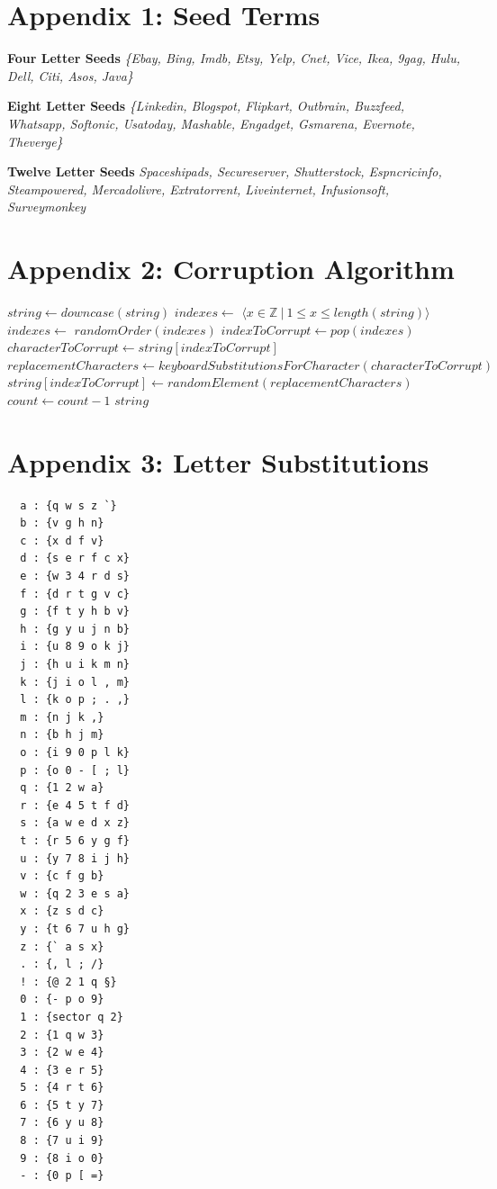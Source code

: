 \documentclass{csfourzero}
\begin{document}
\raggedbottom
\pagebreak


\pagebreak
\raggedbottom
\section{Appendix 1: Seed Terms}
\textbf{Four Letter Seeds}
\textit{\{Ebay, Bing, Imdb, Etsy, Yelp, Cnet, Vice, Ikea, 9gag, Hulu, Dell, Citi, Asos, Java\}}

\noindent
\textbf{Eight Letter Seeds}
\textit{\{Linkedin, Blogspot, Flipkart, Outbrain, Buzzfeed, Whatsapp, Softonic, Usatoday, Mashable, Engadget, Gsmarena, Evernote, Theverge\}}

\noindent
\textbf{Twelve Letter Seeds}
\textit{{Spaceshipads, Secureserver, Shutterstock, Espncricinfo, Steampowered, Mercadolivre, Extratorrent, Liveinternet, Infusionsoft, Surveymonkey}}

\pagebreak
\raggedbottom
\section{Appendix 2: Corruption Algorithm}
  \begin{algorithmic}
        \State $string \gets downcase(string)$
        \State $indexes \gets$ $\langle x \in \mathbb{Z} \ \vert \ 1 \leq x \leq length(string) \rangle$
        \State $indexes \gets$ $randomOrder(indexes)$
        \Repeat
        \State $indexToCorrupt \gets pop(indexes)$
        \State $characterToCorrupt \gets string[indexToCorrupt]$
        \State $replacementCharacters \gets keyboardSubstitutionsForCharacter(characterToCorrupt)$
        \State $string[indexToCorrupt] \gets randomElement(replacementCharacters)$
        \State $count \gets count - 1$
        \State \Return $string$
    \EndFunction
  \end{algorithmic}

\pagebreak
\raggedbottom
\section{Appendix 3: Letter Substitutions}
\begin{multicols}{2}
  \begin{verbatim}
  a : {q w s z `}
  b : {v g h n}
  c : {x d f v}
  d : {s e r f c x}
  e : {w 3 4 r d s}
  f : {d r t g v c}
  g : {f t y h b v}
  h : {g y u j n b}
  i : {u 8 9 o k j}
  j : {h u i k m n}
  k : {j i o l , m}
  l : {k o p ; . ,}
  m : {n j k ,}
  n : {b h j m}
  o : {i 9 0 p l k}
  p : {o 0 - [ ; l}
  q : {1 2 w a}
  r : {e 4 5 t f d}
  s : {a w e d x z}
  t : {r 5 6 y g f}
  u : {y 7 8 i j h}
  v : {c f g b}
  w : {q 2 3 e s a}
  x : {z s d c}
  y : {t 6 7 u h g}
  z : {` a s x}
  . : {, l ; /}
  ! : {@ 2 1 q §}
  0 : {- p o 9}
  1 : {sector q 2}
  2 : {1 q w 3}
  3 : {2 w e 4}
  4 : {3 e r 5}
  5 : {4 r t 6}
  6 : {5 t y 7}
  7 : {6 y u 8}
  8 : {7 u i 9}
  9 : {8 i o 0}
  - : {0 p [ =}
  \end{verbatim}
\end{multicols}
\end{document}
